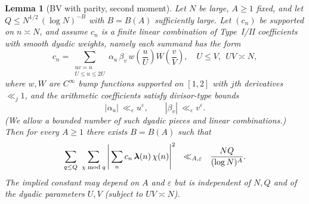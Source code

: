 \documentclass[11pt]{article}
\newtheorem{lemma}{Lemma}[part]
\theoremstyle{definition}
\theoremstyle{remark}
\numberwithin{equation}{part}
\begin{document}
\begin{lemma}[BV with parity, second moment]\label{lem:BVP2M}
	Let $N$ be large, $A\ge 1$ fixed, and let $Q\le N^{1/2}\,(\log N)^{-B}$ with $B=B(A)$ sufficiently large.
	Let $(c_n)$ be supported on $n\asymp N$, and assume $c_n$ is a finite linear combination of Type~I/II coefficients with smooth dyadic weights, namely each summand has the form
	\[
		c_n=\sum_{\substack{uv=n\\ U\le u\le 2U}} \alpha_u\,\beta_v\,w\!\left(\frac{u}{U}\right)W\!\left(\frac{v}{V}\right),
		\quad U\le V,\ \ UV\asymp N,
	\]
	where $w,W$ are $C^\infty$ bump functions supported on $[1,2]$ with $j$th derivatives $\ll_j 1$, and the arithmetic coefficients satisfy divisor-type bounds
	\[
		|\alpha_u|\ \ll_\varepsilon u^{\varepsilon},\qquad |\beta_v|\ \ll_\varepsilon v^{\varepsilon}.
	\]
	(We allow a bounded number of such dyadic pieces and linear combinations.)
	Then for every $A\ge 1$ there exists $B=B(A)$ such that
	\begin{equation}\label{eq:BV-parity-2nd-goal}
		\sum_{q\le Q}\ \sum_{\chi\bmod q}
		\Bigg|\sum_{n} c_n\,\boldsymbol{\lambda}(n)\,\chi(n)\Bigg|^2
		\ \ \ll_{A,\varepsilon}\ \ \frac{NQ}{(\log N)^A}.
	\end{equation}
	The implied constant may depend on $A$ and $\varepsilon$ but is independent of $N,Q$ and of the dyadic parameters $U,V$ (subject to $UV\asymp N$).
\end{lemma}
\end{document}
